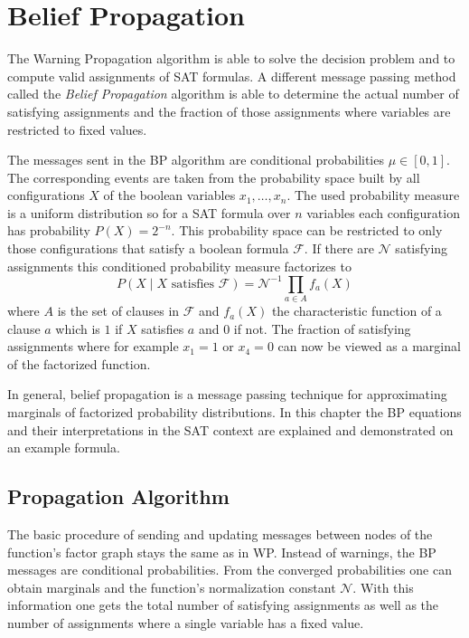 \section{Belief Propagation} \label{BP}

The Warning Propagation algorithm is able to solve the decision problem and to compute valid assignments of SAT formulas. A different message passing method called the \emph{Belief Propagation} algorithm is able to determine the actual number of satisfying assignments and the fraction of those assignments where variables are restricted to fixed values. 

The messages sent in the BP algorithm are conditional probabilities $\mu \in [0, 1]$. The corresponding events are taken from the probability space built by all configurations $X$ of the  boolean variables $x_1, \ldots, x_n$. The used probability measure is a uniform distribution so for a SAT formula over $n$ variables each configuration has probability $P(X) = 2^{-n}$. \newline
This probability space can be restricted to only those configurations that satisfy a boolean formula $\mathcal{F}$. If there are $\mathcal{N}$ satisfying assignments this conditioned probability measure factorizes to $$P(X \; | \; X \text{ satisfies } \mathcal{F}) = \mathcal{N}^{-1} \prod_{a \in A} f_a(X)$$
where $A$ is the set of clauses in $\mathcal{F}$ and $f_a(X)$ the characteristic function of a clause $a$ which is $1$ if $X$ satisfies $a$ and $0$ if not. \newline
The fraction of satisfying assignments where for example $x_1 = 1$ or $x_4 = 0$ can now be viewed as a marginal of the factorized function. \newline

In general, belief propagation is a message passing technique for approximating marginals of factorized probability distributions. In this chapter the BP equations and their interpretations in the SAT context are explained and demonstrated on an example formula.

\subsection{Propagation Algorithm} \label{BPA}

The basic procedure of sending and updating messages between nodes of the function's factor graph stays the same as in WP. Instead of warnings, the BP messages are conditional probabilities. From the converged probabilities one can obtain marginals and the function's normalization constant $\mathcal{N}$. With this information one gets the total number of satisfying assignments as well as the number of assignments where a single variable has a fixed value.


